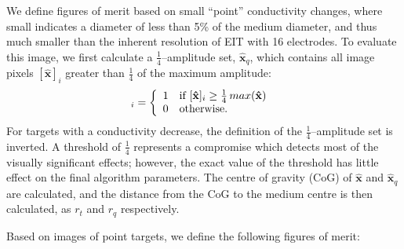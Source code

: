 \documentclass[12pt]{iopart}
\newcommand{\xH}{\mbox{$\mathbf{\hat x}$}}
\begin{document}
We define figures of merit based on small ``point''
conductivity changes, where small indicates a diameter
of less than 5\% of the medium diameter, and thus
much smaller than the inherent resolution of EIT with
16 electrodes.
To evaluate this image, we first calculate
a $\frac{1}{4}$--amplitude set, $\xH_q$, which
contains all image pixels $[\xH]_i$ greater
than $\frac{1}{4}$ of the maximum amplitude:
\begin{equation}
[\xH_q]_i = \left\{ \begin{array}{ll}
    1 & \mbox{if~} [\xH]_i  \geq \mbox{$ \frac{1}{4}\mathop{max}(\xH)$ } \\
    0 & \mbox{otherwise}.
\end{array} \right.
\end{equation}
For targets
with a conductivity decrease, the definition
of the $\frac{1}{4}$--amplitude set is inverted.
A threshold of $\frac{1}{4}$ represents a compromise
which detects most of the visually significant effects;
however, the exact value of the threshold has little effect on
the final algorithm parameters.
The centre of gravity (CoG) of $\xH$ and $\xH_q$ are
calculated, and the distance from the CoG to the 
medium centre is then calculated, as $r_t$ and $r_q$
respectively.

Based on images of point targets, we define the following
figures of merit:
\end{document}
